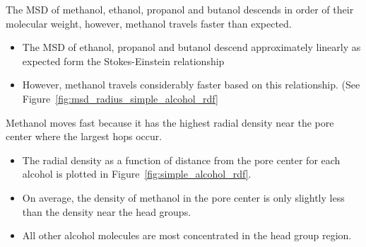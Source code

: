 \documentclass{article}
\begin{document}
  The MSD of methanol, ethanol, propanol and butanol descends in order of 
  their molecular weight, however, methanol travels faster than expected.  %
  \begin{itemize}
    \item The MSD of ethanol, propanol and butanol descend approximately
    linearly as expected form the Stokes-Einstein relationship  %
    \item However, methanol travels considerably faster based on this relationship. (See Figure~\ref{fig:msd_radius_simple_alcohol_rdf}
  \end{itemize}    
    
  Methanol moves fast because it has the highest radial density near the pore center where
  the largest hops occur.
  \begin{itemize} 
    \item The radial density as a function of distance from the pore center
    for each alcohol is plotted in Figure~\ref{fig:simple_alcohol_rdf}.
    \item On average, the density of methanol in the pore center is only slightly
    less than the density near the head groups.
    \item All other alcohol molecules are most concentrated in the head group region.
  \end{itemize}
  
\end{document}
